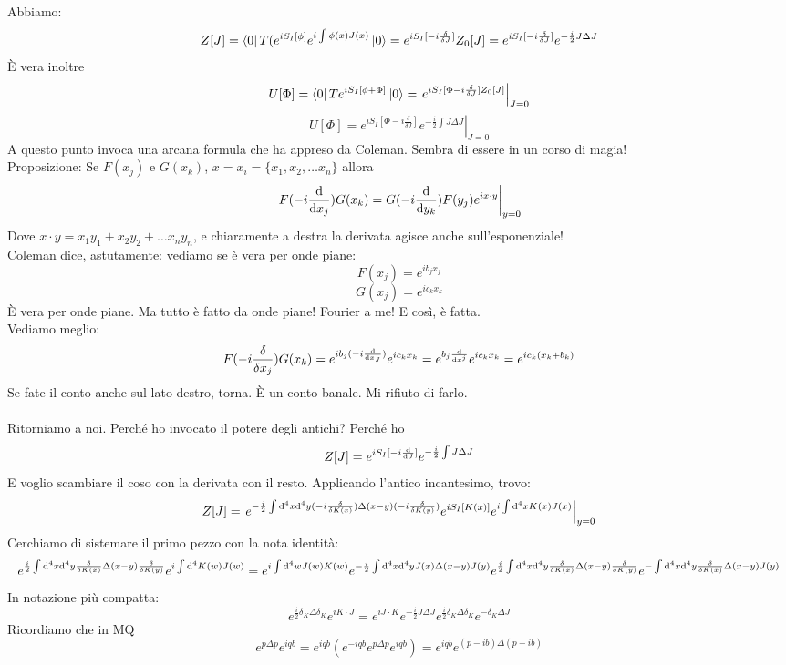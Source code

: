 \documentclass[a4paper, 11pt]{article}
\begin{document}
	
	Abbiamo:
	\[Z[J] = \left\langle 0\right|T(e^{iS_I[\phi]}e^{i\int{\phi(x)J(x)}}\left| 0\right\rangle = e^{iS_I[-i\frac{\delta}{\delta J}]} Z_0[J] = e^{iS_I[-i\frac{\delta}{\delta J}]} e^{-\frac{i}{2}J\Delta J}\]
	È vera inoltre
	\[U[\Phi]=\left\langle 0\right|Te^{i S_I [\phi+\Phi]}\left| 0\right\rangle = \left. e^{iS_I[\Phi - i\frac{\delta}{\delta J}]Z_0[J]} \right|_{J=0}\]
	\[U[\Phi]= \left. e^{iS_I[\Phi-i\frac{\delta}{\delta J}]} e^{-\frac{i}{2}\int J\Delta J} \right|_{J=0}\]
	A questo punto invoca una arcana formula che ha appreso da Coleman. Sembra di essere in un corso di magia!\\
	Proposizione: Se $F(x_j)$ e $G(x_k)$, $x = x_i = \{x_1,x_2,\dots x_n\}$ allora
	\[\left. F(-i\frac{\mathrm{d}}{\mathrm{d} x_j})G(x_k) = G(-i\frac{\mathrm{d}}{\mathrm{d} y_k}) F(y_j) e^{ix\cdot y} \right|_{y=0}\]
	Dove $x\cdot y = x_1 y_1 + x_2 y_2 + \dots x_n y_n$, e chiaramente a destra la derivata agisce anche sull'esponenziale!\\
	Coleman dice, astutamente: vediamo se è vera per onde piane:
	\[F(x_j)=e^{ib_j x_j}\]
	\[G(x_j)=e^{ic_k x_k}\]
	È vera per onde piane. Ma tutto è fatto da onde piane! Fourier a me! E così, è fatta.\\
	Vediamo meglio:
	\[F(-i\frac{\delta}{\delta x_j})G(x_k) = e^{ib_j (-i\frac{\mathrm{d}}{\mathrm{d} x_J})} e^{ic_k x_k} = e^{b_j \frac{\mathrm{d}}{\mathrm{d} x^j}} e^{ic_k x_k} = e^{ic_k (x_k + b_k)}\]
	Se fate il conto anche sul lato destro, torna. È un conto banale. Mi rifiuto di farlo.\\
	\\
	\noindent Ritorniamo a noi. Perché ho invocato il potere degli antichi? Perché ho
	\[Z[J] = e^{iS_I[-i\frac{\mathrm{d}}{\mathrm{d} J}]}e^{-\frac{i}{2}\int J\Delta J}\]
	E voglio scambiare il coso con la derivata con il resto. Applicando l'antico incantesimo, trovo:
	\[Z[J] = \left. e^{-\frac{i}{2} \int \mathrm{d}^4x \mathrm{d}^4y (-i\frac{\delta}{\delta K(x)}) \Delta(x-y) (-i\frac{\delta}{\delta K(y)})} e^{iS_I[K(x)]}e^{i\int \mathrm{d}^4x K(x)J(x)}\right|_{y=0}\]
	Cerchiamo di sistemare il primo pezzo con la nota identità:
	\[e^{\frac{i}{2}\int \mathrm{d}^4x \mathrm{d}^4y \frac{\delta}{\delta K(x)} \Delta(x-y) \frac{\delta}{\delta K(y)}} e^{i\int \mathrm{d}^4 K(w)J(w)} = e^{i\int \mathrm{d}^4w J(w)K(w)} e^{-\frac{i}{2}\int \mathrm{d}^4x \mathrm{d}^4y J(x)\Delta(x-y)J(y)} e^{\frac{i}{2}\int \mathrm{d}^4x \mathrm{d}^4y \frac{\delta}{\delta K(x)} \Delta(x-y) \frac{\delta}{\delta K(y)}} e^{-\int \mathrm{d}^4x \mathrm{d}^4y \frac{\delta}{\delta K(x)} \Delta(x-y) J(y)}\]
	In notazione più compatta:
	\[e^{\frac{i}{2} \delta_K \Delta \delta_K} e^{iK \cdot J} = e^{iJ \cdot K}e^{-\frac{i}{2}J\Delta J}e^{\frac{i}{2}\delta_K \Delta \delta_K} e^{-\delta_K \Delta J}\]
	Ricordiamo che in MQ
	\[e^{p\Delta p}e^{iqb} = e^{iqb} (e^{-iqb}e^{p\Delta p}e^{iqb}) = e^{iqb} e^{(p-ib)\Delta(p+ib)} \]
\end{document}
